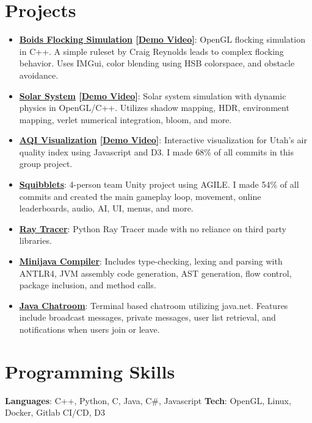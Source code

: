 \documentclass[letterpaper,11pt]{article}
\newcommand{\resumeItem}[2]{
  \item\small{
    \textbf{#1}{: #2 \vspace{-2pt}}
  }
}
\newcommand{\resumeSubItem}[2]{\resumeItem{#1}{#2}\vspace{-4pt}}
\newcommand{\resumeSubHeadingListStart}{\begin{itemize}[leftmargin=*]}
\newcommand{\resumeSubHeadingListEnd}{\end{itemize}}
\begin{document}
\section{Projects}
  \resumeSubHeadingListStart
	\resumeSubItem{\href{https://github.com/Nathan-Hutton/boids}{Boids Flocking Simulation} [\href{https://www.youtube.com/watch?v=AMXlc43AJDk}{Demo Video}]}
	{OpenGL flocking simulation in C++. A simple ruleset by Craig Reynolds leads to complex flocking behavior. Uses IMGui, color blending using HSB colorspace, and obstacle avoidance.}
	\resumeSubItem{\href{https://github.com/Nathan-Hutton/solar-system}{Solar System} [\href{https://www.youtube.com/watch?v=KRmn0imU6Xk}{Demo Video}]}
      {Solar system simulation with dynamic physics in OpenGL/C++. Utilizes shadow mapping, HDR, environment mapping, verlet numerical integration, bloom, and more.}
	\resumeSubItem{\href{https://dataviscourse2024.github.io/group-project-air-quality-visual-1/}{AQI Visualization} [\href{https://www.youtube.com/watch?v=UqxseaUaWtI}{Demo Video}]}
      {Interactive visualization for Utah's air quality index using Javascript and D3. I made 68\% of all commits in this group project.}
    \resumeSubItem{\href{https://github.com/CharlesBirdgv/Squibblets}{Squibblets}}
      {4-person team Unity project using AGILE. I made 54\% of all commits and created the main
gameplay loop, movement, online leaderboards, audio, AI, UI, menus, and more.}
    \resumeSubItem{\href{https://github.com/Nathan-Hutton/Ray-Tracer}{Ray Tracer}}
      {Python Ray Tracer made with no reliance on third party libraries.}
    \resumeSubItem{\href{https://github.com/Nathan-Hutton/Minijava_Compiler_AST}{Minijava Compiler}}
    {Includes type-checking, lexing and parsing with ANTLR4, JVM assembly code generation, AST generation, flow control, package inclusion, and method calls.}
    \resumeSubItem{\href{https://github.com/Nathan-Hutton/Chatroom}{Java Chatroom}}
    {Terminal based chatroom utilizing java.net. Features include broadcast messages, private messages, user list retrieval, and notifications when users join or leave.}
  \resumeSubHeadingListEnd

%
\section{Programming Skills}
 \textbf{Languages}{: C++, Python, C, Java, C\#, Javascript}
 \hfill
 \textbf{Tech}{: OpenGL, Linux, Docker, Gitlab CI/CD, D3}

\end{document}
